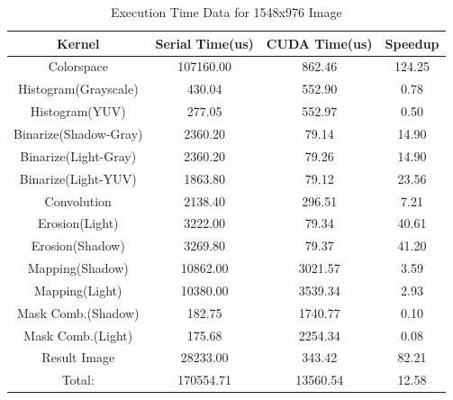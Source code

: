 \documentclass[conference]{IEEEtran}
\begin{document}
      \begin{table}[!t]
      	\renewcommand{\arraystretch}{1.3}
      	\caption{Execution Time Data for 1548x976 Image}
      	\label{table_example}
      	\centering
      	\begin{tabular}{c|c|c|c}
      		\hline
      		\bfseries Kernel & Serial Time(us) & CUDA Time(us) & Speedup \\
      		\hline\hline
      		Colorspace  & 107160.00 & 862.46 & 124.25 \\
      		\hline
      		Histogram(Grayscale) & 430.04 & 552.90 & 0.78 \\
      		\hline
      		Histogram(YUV) & 277.05 & 552.97 & 0.50 \\
      		\hline
      		Binarize(Shadow-Gray) & 2360.20 & 79.14 & 14.90 \\
      		\hline
      		Binarize(Light-Gray) & 2360.20 & 79.26 & 14.90 \\
      		\hline
      		Binarize(Light-YUV) & 1863.80 & 79.12 & 23.56 \\
      		\hline
      		Convolution & 2138.40 & 296.51 & 7.21 \\
      		\hline
      		Erosion(Light) & 3222.00 & 79.34 & 40.61 \\
      		\hline
      		Erosion(Shadow) & 3269.80 & 79.37 & 41.20 \\
      		\hline
      		Mapping(Shadow) & 10862.00 & 3021.57 & 3.59 \\
      		\hline
      		Mapping(Light) & 10380.00 & 3539.34 & 2.93 \\
      		\hline
      		Mask Comb.(Shadow) & 182.75 & 1740.77 & 0.10 \\
      		\hline
      		Mask Comb.(Light) & 175.68 & 2254.34 & 0.08 \\
      		\hline
      		Result Image & 28233.00 & 343.42 & 82.21 \\
      		\hline
      		Total: & 170554.71 & 13560.54 & 12.58 \\
      	\end{tabular}
      \end{table}
\end{document}
